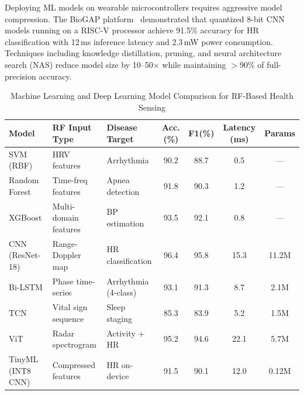\documentclass[journal,twoside]{IEEEtran}
\begin{document}
Deploying ML models on wearable microcontrollers requires aggressive model compression. The BioGAP platform~\cite{ref_biogap2025} demonstrated that quantized 8-bit CNN models running on a RISC-V processor achieve 91.5\% accuracy for HR classification with 12\,ms inference latency and 2.3\,mW power consumption. Techniques including knowledge distillation, pruning, and neural architecture search (NAS) reduce model size by 10--50$\times$ while maintaining $>$90\% of full-precision accuracy.

\begin{table}[!t]
\centering
\caption{Machine Learning and Deep Learning Model Comparison for RF-Based Health Sensing}
\label{tab:ml_comparison}
\footnotesize
\begin{tabular}{@{}l l l c c c c@{}}
\toprule
\textbf{Model} & \textbf{RF Input Type} & \textbf{Disease Target} & \textbf{Acc.(\%)} & \textbf{F1(\%)} & \textbf{Latency (ms)} & \textbf{Params} \\
\midrule
SVM (RBF) & HRV features & Arrhythmia & 90.2 & 88.7 & 0.5 & --- \\
Random Forest & Time-freq features & Apnea detection & 91.8 & 90.3 & 1.2 & --- \\
XGBoost & Multi-domain features & BP estimation & 93.5 & 92.1 & 0.8 & --- \\
CNN (ResNet-18) & Range-Doppler map & HR classification & 96.4 & 95.8 & 15.3 & 11.2M \\
Bi-LSTM & Phase time-series & Arrhythmia (4-class) & 93.1 & 91.3 & 8.7 & 2.1M \\
TCN & Vital sign sequence & Sleep staging & 85.3 & 83.9 & 5.2 & 1.5M \\
ViT & Radar spectrogram & Activity + HR & 95.2 & 94.6 & 22.1 & 5.7M \\
TinyML (INT8 CNN) & Compressed features & HR on-device & 91.5 & 90.1 & 12.0 & 0.12M \\
\bottomrule
\end{tabular}
\end{table}
\end{document}
